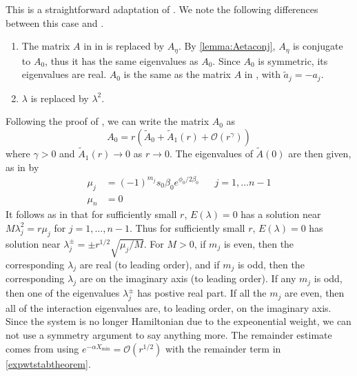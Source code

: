 \documentclass[thesis.tex]{subfiles}
\begin{document}
This is a straightforward adaptation of \cite[Theorem 3(iv)]{Sandstede1998}. We note the following differences between this case and \cite{Sandstede1998}.
\begin{enumerate}
	\item The matrix $A$ in \cite{Sandstede1998} in is replaced by $A_\eta$. By \cref{lemma:Aetaconj}, $A_\eta$ is conjugate to $A_0$, thus it has the same eigenvalues as $A_0$. Since $A_0$ is symmetric, its eigenvalues are real. $A_0$ is the same as the matrix $A$ in \cite[Theorem 2]{Sandstede1998}, with $\tilde{a}_j = -a_j$.
	\item $\lambda$ is replaced by $\lambda^2$.
\end{enumerate}

Following the proof of \cite[Theorem 3]{Sandstede1998}, we can write the matrix $A_0$ as
\[
A_0 = r\left( \tilde{A}_0 + \tilde{A}_1(r) + \mathcal{O}(r^\gamma)\right)
\]
where $\gamma > 0$ and $\tilde{A}_1(r) \rightarrow 0$ as $r \rightarrow 0$. The eigenvalues of $\tilde{A}(0)$ are then given, as in \cite[p.462]{Sandstede1998}  by
\begin{align*}
\mu_j &= (-1)^{m_j} s_0 \beta_0 e^{\phi_0/2 \beta_0} && j = 1, \dots n-1 \\
\mu_n &= 0
\end{align*}
It follows as in \cite{Sandstede1998} that for sufficiently small $r$, $E(\lambda) = 0$ has a solution near $M \lambda_j^2 = r \mu_j$ for $j = 1, \dots, n-1$. Thus for sufficiently small $r$, $E(\lambda) = 0$ has solution near $\lambda_j^\pm = \pm r^{1/2} \sqrt{\mu_j/M}$. For $M > 0$, if $m_j$ is even, then the corresponding $\lambda_j$ are real (to leading order), and if $m_j$ is odd, then the corresponding $\lambda_j$ are on the imaginary axis (to leading order). If any $m_j$ is odd, then one of the eigenvalues $\lambda_j^\pm$ has postive real part. If all the $m_j$ are even, then all of the interaction eigenvalues are, to leading order, on the imaginary axis. Since the system is no longer Hamiltonian due to the expeonential weight, we can not use a symmetry argument to say anything more. The remainder estimate comes from using $e^{-\alpha X_{\min}} = \mathcal{O}(r^{1/2})$ with the remainder term in \cref{expwtstabtheorem}.

\iffulldocument\else
	
	
\fi
\end{document}
